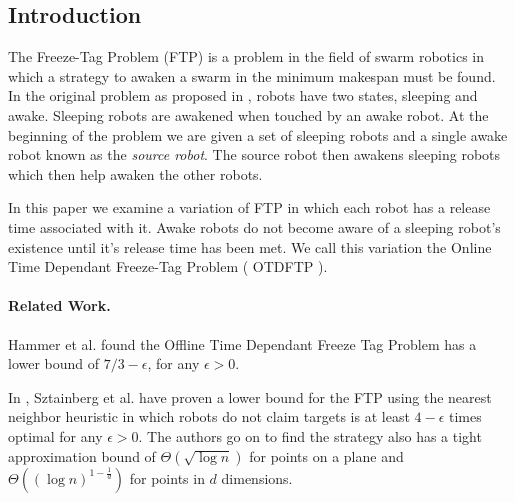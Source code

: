 \documentclass[twoside]{article}
\begin{document}
\maketitle 				%
\thispagestyle{fancy} 	%


\begin{multicols}{2} 	%


\section{Introduction}
The Freeze-Tag Problem (FTP) \cite{FTP.0} is a problem in the field of swarm robotics in which a strategy to awaken a swarm in the minimum makespan must be found. In the original problem as proposed in \cite{FTP.0}, robots have two states, sleeping and awake. Sleeping robots are awakened when touched by an awake robot. At the beginning of the problem we are given a set of sleeping robots and a single awake robot known as the \textit{source robot}. The source robot then awakens sleeping robots which then help awaken the other robots.

In this paper we examine a variation of FTP \cite{FTP.1} in which each robot has a release time associated with it. Awake robots do not become aware of a sleeping robot's existence until it's release time has been met. We call this variation the Online Time Dependant Freeze-Tag Problem ( OTDFTP ).  

\paragraph{Related Work.}
Hammer et al. \cite{FTP.1} found the Offline Time Dependant Freeze Tag Problem has a lower bound of $7/3 - \epsilon$, for any $\epsilon > 0$. 

In \cite{FTP.2}, Sztainberg et al. have proven a lower bound for the FTP using the nearest neighbor heuristic in which robots do not claim targets is at least $4-\epsilon$ times optimal for any $\epsilon > 0$\cite[Theorem ]{FTP.2}. The authors go on to find the strategy also has a tight approximation bound of $\Theta(\sqrt{\log n})$ for points on a plane and $\Theta((\log n)^{1-\frac{1}{d}})$ for points in $d$ dimensions.


\end{multicols}
\end{document}
